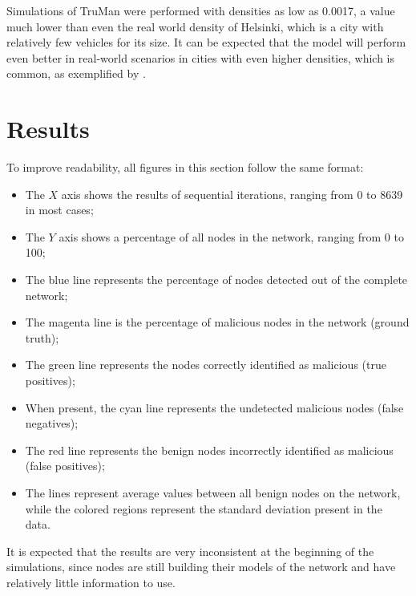Simulations of TruMan were performed with densities as low as 0.0017, a value much lower than even the real world density of Helsinki, which is a city with relatively few vehicles for its size.
It can be expected that the model will perform even better in real-world scenarios in cities with even higher densities, which is common, as exemplified by .

%

\section{Results}
\label{section:results}

To improve readability, all figures in this section follow the same format:
\begin{itemize}
	\item The $X$ axis shows the results of sequential iterations, ranging from 0 to 8639 in most cases;
	\item The $Y$ axis shows a percentage of all nodes in the network, ranging from 0 to 100;
	\item The blue line represents the percentage of nodes detected out of the complete network;
	\item The magenta line is the percentage of malicious nodes in the network (ground truth);
	\item The green line represents the nodes correctly identified as malicious (true positives);
	\item When present, the cyan line represents the undetected malicious nodes (false negatives); 
	\item The red line represents the benign nodes incorrectly identified as malicious (false positives);
	\item The lines represent average values between all benign nodes on the network, while the colored regions represent the standard deviation present in the data.
\end{itemize}

It is expected that the results are very inconsistent at the beginning of the simulations, since nodes are still building their models of the network and have relatively little information to use.


